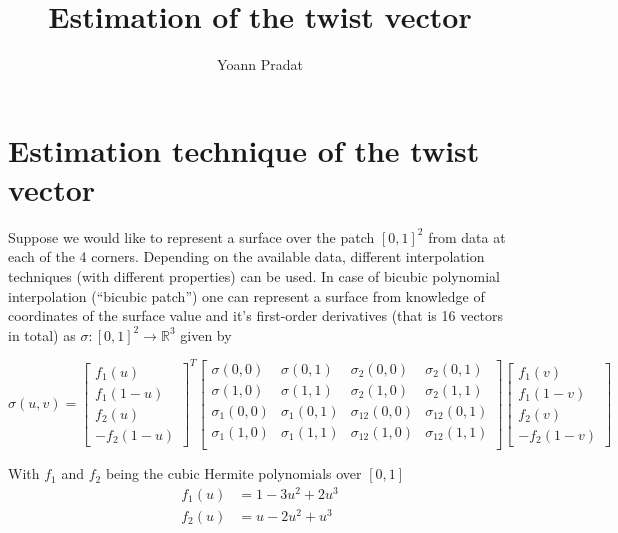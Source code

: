 \documentclass[a4paper, 11pt]{article}
\begin{document}
\title{Estimation of the twist vector}
\author{Yoann Pradat}
\maketitle
\tableofcontents
\clearpage

\section{Estimation technique of the twist vector}

Suppose we would like to represent a surface over the patch ${[0,1]}^2$ from data at each of the 4 corners.  Depending 
on the available data, different interpolation techniques (with different properties) can be used. In case of bicubic 
polynomial interpolation (“bicubic patch”) one can represent a surface from knowledge of coordinates of the surface 
value and it's first-order derivatives (that is 16 vectors in total) as $\sigma : {[0,1]}^2 \to \mathbb{R}^3$ given by

\begin{equation}
  \sigma(u,v) = \begin{bmatrix} f_1(u) \\ f_1(1-u) \\ f_2(u) \\ -f_2(1-u) \end{bmatrix}^T
  \begin{bmatrix}
    \sigma(0,0) & \sigma(0,1) & \sigma_2(0,0) & \sigma_2(0,1) \\
    \sigma(1,0) & \sigma(1,1) & \sigma_2(1,0) & \sigma_2(1,1) \\
    \sigma_1(0,0) & \sigma_1(0,1) & \sigma_{12}(0,0) & \sigma_{12}(0,1) \\
    \sigma_1(1,0) & \sigma_1(1,1) & \sigma_{12}(1,0) & \sigma_{12}(1,1) \\
  \end{bmatrix}
  \begin{bmatrix} f_1(v) \\ f_1(1-v) \\ f_2(v) \\ -f_2(1-v) \end{bmatrix}
\end{equation}

With $f_1$ and $f_2$ being the cubic Hermite polynomials over $[0,1]$
\begin{align*}
  f_1(u) &= 1 - 3u^2 + 2u^3 \\
  f_2(u) &= u - 2u^2 + u^3 \\
\end{align*}
\end{document}
